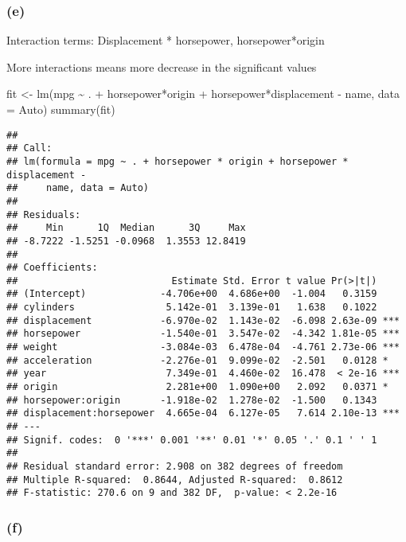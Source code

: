 \documentclass[
]{article}
\newenvironment{Shaded}{\begin{snugshade}}{\end{snugshade}}
\newcommand{\AttributeTok}[1]{\textcolor[rgb]{0.77,0.63,0.00}{#1}}
\newcommand{\FunctionTok}[1]{\textcolor[rgb]{0.00,0.00,0.00}{#1}}
\newcommand{\NormalTok}[1]{#1}
\newcommand{\OtherTok}[1]{\textcolor[rgb]{0.56,0.35,0.01}{#1}}
\newcommand{\SpecialCharTok}[1]{\textcolor[rgb]{0.00,0.00,0.00}{#1}}
\begin{document}
\hypertarget{e}{%
\subsubsection{(e)}\label{e}}

Interaction terms: Displacement * horsepower, horsepower*origin

More interactions means more decrease in the significant values

\begin{Shaded}
\begin{Highlighting}[]
\NormalTok{fit }\OtherTok{\textless{}{-}} \FunctionTok{lm}\NormalTok{(mpg }\SpecialCharTok{\textasciitilde{}}\NormalTok{ . }\SpecialCharTok{+}\NormalTok{ horsepower}\SpecialCharTok{*}\NormalTok{origin }\SpecialCharTok{+}\NormalTok{ horsepower}\SpecialCharTok{*}\NormalTok{displacement }\SpecialCharTok{{-}}\NormalTok{ name, }\AttributeTok{data =}\NormalTok{ Auto)}
\FunctionTok{summary}\NormalTok{(fit)}
\end{Highlighting}
\end{Shaded}

\begin{verbatim}
## 
## Call:
## lm(formula = mpg ~ . + horsepower * origin + horsepower * displacement - 
##     name, data = Auto)
## 
## Residuals:
##     Min      1Q  Median      3Q     Max 
## -8.7222 -1.5251 -0.0968  1.3553 12.8419 
## 
## Coefficients:
##                           Estimate Std. Error t value Pr(>|t|)    
## (Intercept)             -4.706e+00  4.686e+00  -1.004   0.3159    
## cylinders                5.142e-01  3.139e-01   1.638   0.1022    
## displacement            -6.970e-02  1.143e-02  -6.098 2.63e-09 ***
## horsepower              -1.540e-01  3.547e-02  -4.342 1.81e-05 ***
## weight                  -3.084e-03  6.478e-04  -4.761 2.73e-06 ***
## acceleration            -2.276e-01  9.099e-02  -2.501   0.0128 *  
## year                     7.349e-01  4.460e-02  16.478  < 2e-16 ***
## origin                   2.281e+00  1.090e+00   2.092   0.0371 *  
## horsepower:origin       -1.918e-02  1.278e-02  -1.500   0.1343    
## displacement:horsepower  4.665e-04  6.127e-05   7.614 2.10e-13 ***
## ---
## Signif. codes:  0 '***' 0.001 '**' 0.01 '*' 0.05 '.' 0.1 ' ' 1
## 
## Residual standard error: 2.908 on 382 degrees of freedom
## Multiple R-squared:  0.8644, Adjusted R-squared:  0.8612 
## F-statistic: 270.6 on 9 and 382 DF,  p-value: < 2.2e-16
\end{verbatim}

\hypertarget{f}{%
\subsubsection{(f)}\label{f}}
\end{document}
